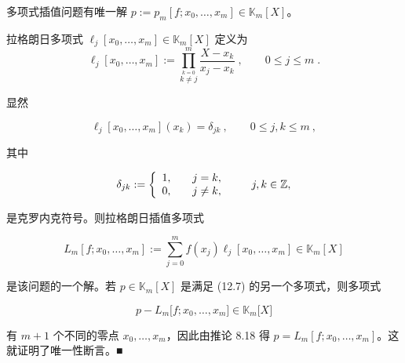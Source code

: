 \begin{proposition}

多项式插值问题有唯一解  $ p := p_m[f; x_0, \ldots, x_m] \in \mathbb{K}_m[X] $。

\proofhead
拉格朗日多项式  $ \ell_j[x_0, \ldots, x_m] \in \mathbb{K}_m[X] $ 定义为
\[
\ell_{j}[x_{0},\ldots,x_{m}]:=\prod_{\stackrel{k=0}{k\neq j}}^{m}\frac{X-x_{k}}{x_{j}-x_{k}}\;,\qquad0\leq j\leq m\;.
\]

显然

\[
\ell_{j}[x_{0},\ldots,x_{m}](x_{k})=\delta_{j k}~,\qquad0\leq j,k\leq m~,
\]

其中

\begin{equation*}
\delta_{j k}:=\left\{\begin{array}{l l}{1,}&{\quad j=k,}\\ {0,}&{\quad j\neq k,}\\ \end{array}\right.\qquad j,k\in\mathbb{Z},
\end{equation*}

是克罗内克符号。则拉格朗日插值多项式

\begin{equation}
L_{m}[f;x_{0},\ldots,x_{m}]:=\sum_{j=0}^{m}f(x_{j})\ell_{j}[x_{0},\ldots,x_{m}]\in\mathbb{K}_{m}[X]
\end{equation}

是该问题的一个解。若  $ p \in \mathbb{K}_m[X] $ 是满足 (12.7) 的另一个多项式，则多项式

\[
p - L_{m} \lbrack f;x_{0}, \dots, x_{m} \rbrack \in {\mathbb{K}}_{m} \lbrack {X}\rbrack
\]

有 $m+1$ 个不同的零点 $x_0, \ldots, x_m$，因此由推论 8.18 得 $p = L_m[f; x_0, \ldots, x_m]$。这就证明了唯一性断言。■

\end{proposition}

